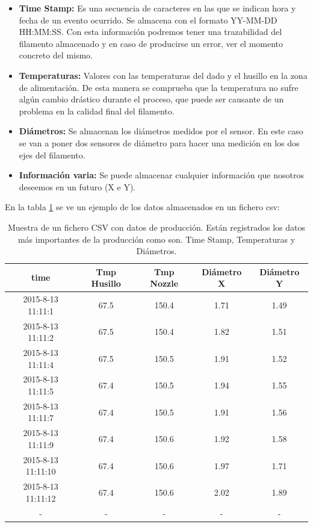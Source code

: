 \begin{itemize}
    \item{\textbf{Time Stamp: }Es una secuencia de caracteres en las que se indican hora y fecha de un evento ocurrido. Se almacena con el formato YY-MM-DD HH:MM:SS. Con esta información podremos tener una trazabilidad del filamento almacenado y en caso de producirse un error, ver el momento concreto del mismo.}
    \item{\textbf{Temperaturas: }Valores con las temperaturas del dado y el husillo en la zona de alimentación. De esta manera se comprueba que la temperatura no sufre algún cambio drástico durante el proceso, que puede ser causante de un problema en la calidad final del filamento.}
    \item{\textbf{Diámetros: }Se almacenan los diámetros medidos por el sensor. En este caso se van a poner dos sensores de diámetro para hacer una medición en los dos ejes del filamento.}
    \item{\textbf{Información varia: }Se puede almacenar cualquier información que nosotros deseemos en un futuro (X e Y).}
\end{itemize}

En la tabla \ref{tab:plc_csv} se ve un ejemplo de los datos almacenados en un fichero csv:

\begin{table}[H]
    \centering
    \begin{tabular}{ccccc}
        {\bf time}         & {\bf Tmp Husillo} & {\bf Tmp Nozzle} & {\bf Diámetro X} & {\bf Diámetro Y} \\ \hline
        2015-8-13 11:11:1  & 67.5              & 150.4            & 1.71         & 1.49         \\
        2015-8-13 11:11:2  & 67.5              & 150.4            & 1.82         & 1.51         \\
        2015-8-13 11:11:4  & 67.5              & 150.5            & 1.91         & 1.52         \\
        2015-8-13 11:11:5  & 67.4              & 150.5            & 1.94         & 1.55         \\
        2015-8-13 11:11:7  & 67.4              & 150.5            & 1.91         & 1.56         \\
        2015-8-13 11:11:9  & 67.4              & 150.6            & 1.92         & 1.58         \\
        2015-8-13 11:11:10 & 67.4              & 150.6            & 1.97         & 1.71         \\
        2015-8-13 11:11:12 & 67.4              & 150.6            & 2.02         & 1.89        \\
                -          &    -              & -                & -                & -
    \end{tabular}
    \caption[Muestra de un fichero CSV con datos de producción.]{Muestra de un fichero CSV con datos de producción. Están registrados los datos más importantes de la producción como son. Time Stamp, Temperaturas y Diámetros.}
    \label{tab:plc_csv}
\end{table}

